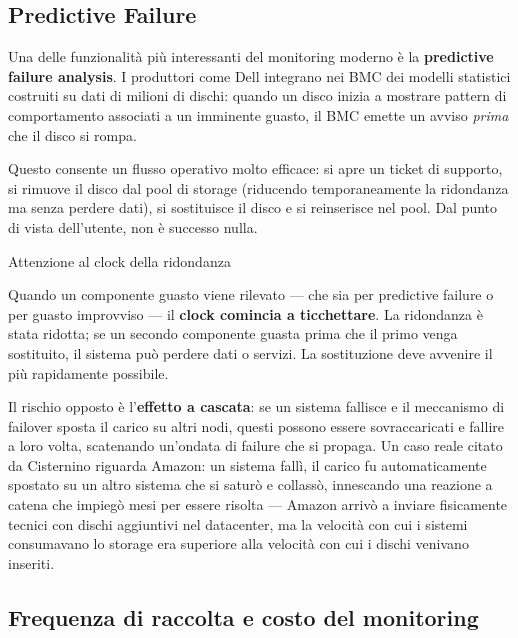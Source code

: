 \documentclass[
  italian,
  openany]{book}
\begin{document}
\subsection{Predictive Failure}\label{predictive-failure}

Una delle funzionalità più interessanti del monitoring moderno è la
\textbf{predictive failure analysis}. I produttori come Dell integrano
nei BMC dei modelli statistici costruiti su dati di milioni di dischi:
quando un disco inizia a mostrare pattern di comportamento associati a
un imminente guasto, il BMC emette un avviso \emph{prima} che il disco
si rompa.

Questo consente un flusso operativo molto efficace: si apre un ticket di
supporto, si rimuove il disco dal pool di storage (riducendo
temporaneamente la ridondanza ma senza perdere dati), si sostituisce il
disco e si reinserisce nel pool. Dal punto di vista dell'utente, non è
successo nulla.

\begin{calloutwarning}{Attenzione al clock della ridondanza}

Quando un componente guasto viene rilevato --- che sia per predictive
failure o per guasto improvviso --- il \textbf{clock comincia a
ticchettare}. La ridondanza è stata ridotta; se un secondo componente
guasta prima che il primo venga sostituito, il sistema può perdere dati
o servizi. La sostituzione deve avvenire il più rapidamente possibile.

\end{calloutwarning}

Il rischio opposto è l'\textbf{effetto a cascata}: se un sistema
fallisce e il meccanismo di failover sposta il carico su altri nodi,
questi possono essere sovraccaricati e fallire a loro volta, scatenando
un'ondata di failure che si propaga. Un caso reale citato da Cisternino
riguarda Amazon: un sistema fallì, il carico fu automaticamente spostato
su un altro sistema che si saturò e collassò, innescando una reazione a
catena che impiegò mesi per essere risolta --- Amazon arrivò a inviare
fisicamente tecnici con dischi aggiuntivi nel datacenter, ma la velocità
con cui i sistemi consumavano lo storage era superiore alla velocità con
cui i dischi venivano inseriti.

\subsection{Frequenza di raccolta e costo del
monitoring}\label{frequenza-di-raccolta-e-costo-del-monitoring}
\end{document}
